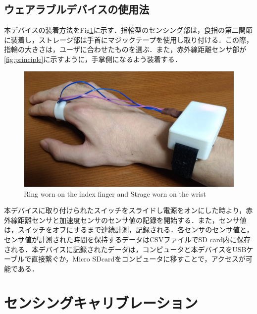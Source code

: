 \subsection{ウェアラブルデバイスの使用法}
本デバイスの装着方法をFig\ref{fig:ring}に示す．指輪型のセンシング部は，食指の第二関節に装着し，ストレージ部は手首にマジックテープを使用し取り付ける．この際，指輪の大きさは，ユーザに合わせたものを選ぶ．また，赤外線距離センサ部が\ref{fig:principle}に示すように，手掌側になるよう装着する．
\begin{figure}[H]
  \centering
  \includegraphics[width=0.8\linewidth]{fig/fal4.png}
  \caption{Ring worn on the index finger and Strage worn on the wrist}
  \label{fig:ring}
\end{figure}

本デバイスに取り付けられたスイッチをスライドし電源をオンにした時より，赤外線距離センサと加速度センサのセンサ値の記録を開始する．また，センサ値は，スイッチをオフにするまで連続計測，記録される．各センサのセンサ値と，センサ値が計測された時間を保持するデータはCSVファイルでSD card内に保存される．本デバイスに記録されたデータは，コンピュータと本デバイスをUSBケーブルで直接繋ぐか，Micro SDcardをコンピュータに移すことで，アクセスが可能である．

\section{センシングキャリブレーション}
